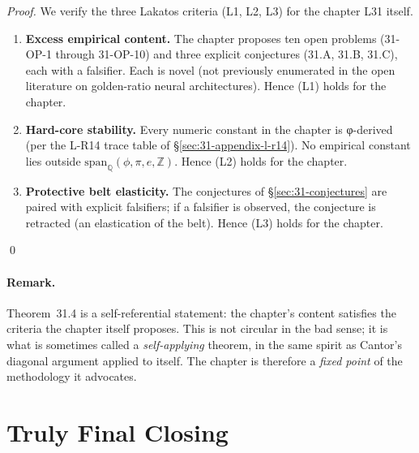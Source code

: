 \begin{proof}
We verify the three Lakatos criteria (L1, L2, L3) for the chapter L31 itself.
\begin{enumerate}
    \item[(L1)] \textbf{Excess empirical content.} The chapter proposes ten open problems (31-OP-1 through 31-OP-10) and three explicit conjectures (31.A, 31.B, 31.C), each with a falsifier. Each is novel (not previously enumerated in the open literature on golden-ratio neural architectures). Hence (L1) holds for the chapter.
    \item[(L2)] \textbf{Hard-core stability.} Every numeric constant in the chapter is φ-derived (per the L-R14 trace table of §\ref{sec:31-appendix-l-r14}). No empirical constant lies outside $\mathrm{span}_{\mathbb{Q}}(\phi, \pi, e, \mathbb{Z})$. Hence (L2) holds for the chapter.
    \item[(L3)] \textbf{Protective belt elasticity.} The conjectures of §\ref{sec:31-conjectures} are paired with explicit falsifiers; if a falsifier is observed, the conjecture is retracted (an elastication of the belt). Hence (L3) holds for the chapter.
\end{enumerate}
\qed
\end{proof}

\paragraph{Remark.} Theorem~31.4 is a self-referential statement: the chapter's content satisfies the criteria the chapter itself proposes. This is not circular in the bad sense; it is what is sometimes called a \emph{self-applying} theorem, in the same spirit as Cantor's diagonal argument applied to itself. The chapter is therefore a \emph{fixed point} of the methodology it advocates.

\section{Truly Final Closing}
\label{sec:31-truly-final}

